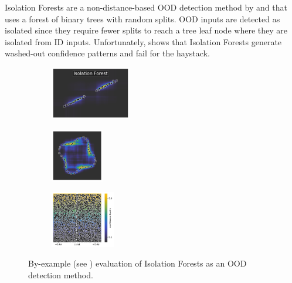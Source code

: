 Isolation Forests are a non-distance-based OOD detection method by \textcite{isolation-forest-2008} and \textcite{isolation-forest-2012} that uses a forest of binary trees with random splits. OOD inputs are detected as isolated since they require fewer splits to reach a tree leaf node where they are isolated from ID inputs. Unfortunately,  shows that Isolation Forests generate washed-out confidence patterns and fail for the haystack.

\begin{figure}[H]
    \centering
    \begin{subfigure}
        \centering
        \includegraphics[width=0.388\textwidth,valign=t]{ood-detection/figures/ood-detection/confidence-line-isolation.pdf}
    \end{subfigure}
    \begin{subfigure}
        \centering
        \includegraphics[width=0.254\textwidth,valign=t]{ood-detection/figures/ood-detection/confidence-circle-isolation.pdf}
    \end{subfigure}
    \begin{subfigure}
        \centering
        \includegraphics[width=0.308\textwidth,valign=t]{ood-detection/figures/ood-detection/confidence-haystack-isolation.pdf}
    \end{subfigure}

    \caption[Isolation Forests as an OOD detection method]{By-example (see ) evaluation of Isolation Forests \cite{isolation-forest-2008, isolation-forest-2012} as an OOD detection method.}
    \label{fig:if-ood-detection}
\end{figure}

